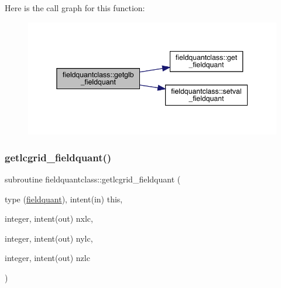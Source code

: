 Here is the call graph for this function\+:\nopagebreak
\begin{figure}[H]
\begin{center}
\leavevmode
\includegraphics[width=345pt]{namespacefieldquantclass_a2c0b0d0301e9ae5ccd8b2273ffc95ff3_cgraph}
\end{center}
\end{figure}
\mbox{\label{namespacefieldquantclass_aa439599c2570610c1c2e0bfacc135603}} 
\subsubsection{\texorpdfstring{getlcgrid\_fieldquant()}{getlcgrid\_fieldquant()}}
{\footnotesize\ttfamily subroutine fieldquantclass\+::getlcgrid\+\_\+fieldquant (\begin{DoxyParamCaption}\item[{type (\mbox{\hyperlink{namespacefieldquantclass_structfieldquantclass_1_1fieldquant}{fieldquant}}), intent(in)}]{this,  }\item[{integer, intent(out)}]{nxlc,  }\item[{integer, intent(out)}]{nylc,  }\item[{integer, intent(out)}]{nzlc }\end{DoxyParamCaption})}

\mbox{\label{namespacefieldquantclass_a1424ab249c01287bbfe998370d2c5703}} 
